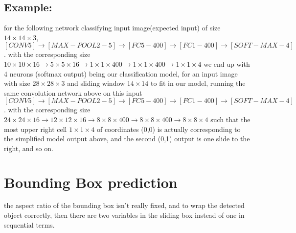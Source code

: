 \documentclass[4apaper,12pt]{book}
\begin{document}
\begin{description}
\begin{description}
\begin{description}
          \subsection{Example:}
          \begin{description}
          \item for the following network classifying input image(expected input) of size $14\times{14}\times{3}$, $[CONV5]\rightarrow [MAX-POOL2-5] \rightarrow [FC5-400] \rightarrow [FC1-400] \rightarrow [SOFT-MAX-4]$. with the corresponding size $10\times{10}\times{16}\rightarrow 5\times{5}\times{16} \rightarrow 1\times{1}\times{400} \rightarrow 1\times{1}\times{400} \rightarrow 1\times{1}\times{4}$ we end up with 4 neurons (softmax output) being our classification model, for an input image  with size $28\times{28}\times{3}$ and sliding window $14\times{14}$ to fit in our model, running the same convolution network above on this input  $[CONV5]\rightarrow [MAX-POOL2-5] \rightarrow [FC5-400] \rightarrow [FC1-400] \rightarrow [SOFT-MAX-4]$. with the corresponding size $24\times{24}\times{16}\rightarrow 12\times{12}\times{16} \rightarrow 8\times{8}\times{400} \rightarrow 8\times{8}\times{400} \rightarrow 8\times{8}\times{4}$ such that the most upper right cell $1\times{1}\times{4}$ of coordinates (0,0) is actually corresponding to the simplified model output above, and the second (0,1) output is one slide to the right, and so on.

          \end{description}

        \end{description}
      \end{description}
      \section{Bounding Box prediction}
    \item the aspect ratio of the bounding box isn't really fixed, and to wrap the detected object correctly, then there are two variables in the sliding box instead of one in sequential terms.

\end{description}
\end{document}
